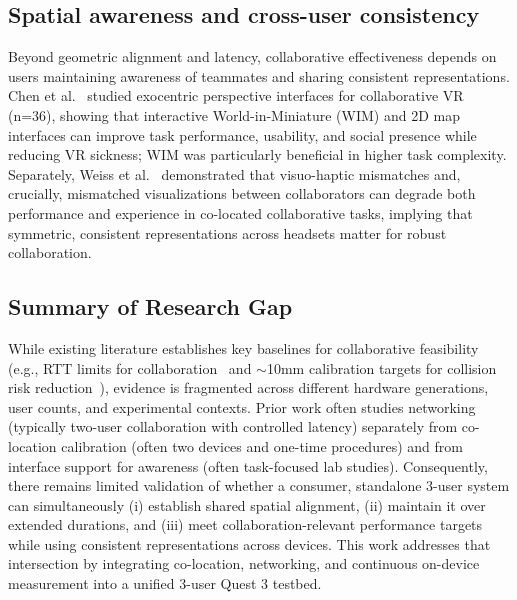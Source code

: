 \subsection{Spatial awareness and cross-user consistency}
Beyond geometric alignment and latency, collaborative effectiveness depends on users maintaining awareness of teammates and sharing consistent representations. Chen et al.~\cite{ChenLei2024Eoep} studied exocentric perspective interfaces for collaborative VR (n=36), showing that interactive World-in-Miniature (WIM) and 2D map interfaces can improve task performance, usability, and social presence while reducing VR sickness; WIM was particularly beneficial in higher task complexity. Separately, Weiss et al.~\cite{WeissYannick2025ItEo} demonstrated that visuo-haptic mismatches and, crucially, mismatched visualizations between collaborators can degrade both performance and experience in co-located collaborative tasks, implying that symmetric, consistent representations across headsets matter for robust collaboration.

\subsection{Summary of Research Gap}
While existing literature establishes key baselines for collaborative feasibility (e.g., RTT limits for collaboration~\cite{VanDammeSam2024Iolo} and $\sim$10mm calibration targets for collision risk reduction~\cite{ReimerDennis2021CfSV}), evidence is fragmented across different hardware generations, user counts, and experimental contexts. Prior work often studies networking (typically two-user collaboration with controlled latency) separately from co-location calibration (often two devices and one-time procedures) and from interface support for awareness (often task-focused lab studies). Consequently, there remains limited validation of whether a consumer, standalone 3-user system can simultaneously (i) establish shared spatial alignment, (ii) maintain it over extended durations, and (iii) meet collaboration-relevant performance targets while using consistent representations across devices. This work addresses that intersection by integrating co-location, networking, and continuous on-device measurement into a unified 3-user Quest 3 testbed.
